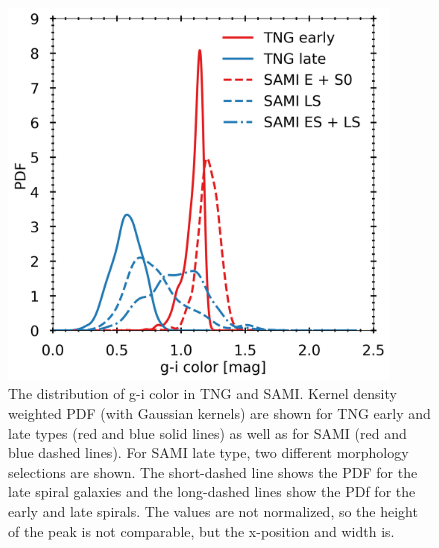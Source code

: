 \begin{figure}
    \centering
    \includegraphics[width=0.9\textwidth]{images/CB_PDF.png}
    \caption{The distribution of g-i color in TNG and SAMI. Kernel density weighted PDF (with Gaussian kernels) are shown for TNG early and late types (red and blue solid lines) as well as for SAMI (red and blue dashed lines). For SAMI late type, two different morphology selections are shown. The short-dashed line shows the PDF for the late spiral galaxies and the long-dashed lines show the PDf for the early and late spirals. The values are not normalized, so the height of the peak is not comparable, but the x-position and width is.}
    \label{CB_PDF}
\end{figure}
